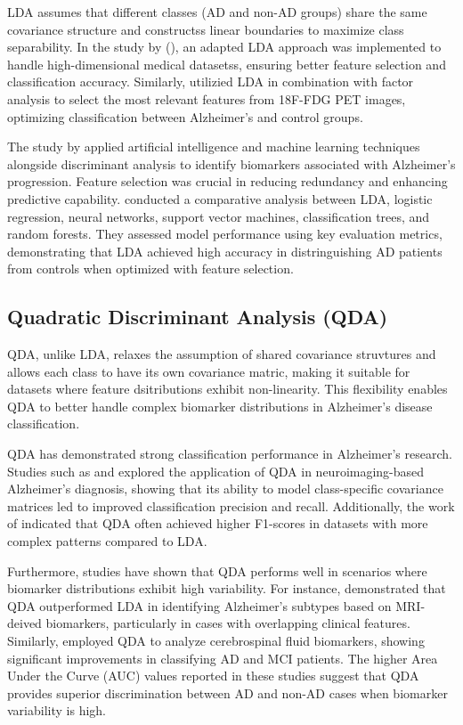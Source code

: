 \documentclass[12pt]{article}
\begin{document}
LDA assumes that different classes (AD and non-AD groups) share the same covariance structure and constructss linear boundaries to maximize class separability. In the study by (\cite{le2020_lda_highdimensional}), an adapted LDA approach was implemented to handle high-dimensional medical datasetss, ensuring better feature selection and
classification accuracy. Similarly, \cite{salasgonzalez2010_factor_analysis_lda} utilizied LDA in combination with factor analysis to select the most relevant features from 18F-FDG PET images, optimizing classification between Alzheimer's and control groups.

The study by \cite{yilmaz2021_metabolic_biomarkers_ad} applied artificial intelligence and machine learning techniques alongside discriminant analysis to identify biomarkers associated with Alzheimer's progression. Feature selection was crucial in reducing redundancy and enhancing predictive capability. \cite{maroco2011_data_mining_dementia}
conducted a comparative analysis between LDA, logistic regression, neural networks, support vector machines, classification trees, and random forests. They assessed model performance using key evaluation metrics, demonstrating that LDA achieved high accuracy in distringuishing AD patients from controls when optimized with feature selection.

\subsection{Quadratic Discriminant Analysis (QDA)}
\noindent

QDA, unlike LDA, relaxes the assumption of shared covariance struvtures and allows each class to have its own covariance matric, making it suitable for datasets where feature dsitributions exhibit non-linearity. This flexibility enables QDA to better handle complex biomarker distributions in Alzheimer's disease classification.

QDA has demonstrated strong classification performance in Alzheimer's research. Studies such as \cite{zhang2017_qda_neuroimaging} and \cite{pereira2020_qda_mri} explored the application of QDA in neuroimaging-based Alzheimer's diagnosis, showing that its ability to model class-specific covariance matrices led to improved classification precision
and recall. Additionally, the work of \cite{maroco2011_data_mining_dementia} indicated that QDA often achieved higher F1-scores in datasets with more complex patterns compared to LDA.

Furthermore, studies have shown that QDA performs well in scenarios where biomarker distributions exhibit high variability. For instance, \cite{lee2015_qda_mri_biomarker} demonstrated that QDA outperformed LDA in identifying Alzheimer's subtypes based on MRI-deived biomarkers, particularly in cases with overlapping clinical features. Similarly, 
\cite{garciarodriguez2016_qda_csf} employed QDA to analyze cerebrospinal fluid biomarkers, showing significant improvements in classifying AD and MCI patients. The higher Area Under the Curve (AUC) values reported in these studies suggest that QDA provides superior discrimination between AD and non-AD cases when biomarker variability is high.
\end{document}
